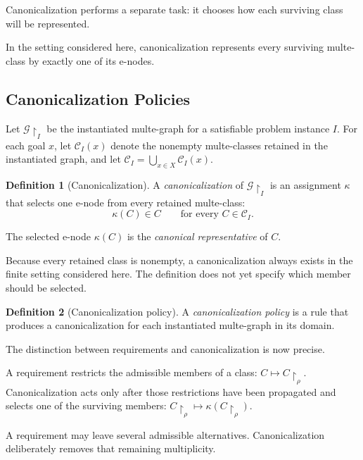 \documentclass[sigconf,nonacm]{acmart}
\theoremstyle{definition}
\newtheorem{definition}{Definition}[section]
\theoremstyle{plain}
\theoremstyle{remark}
\begin{document}
Canonicalization performs a separate task: it chooses how each
surviving class will be represented.

In the setting considered here, canonicalization represents every
surviving multe-class by exactly one of its e-nodes.

\subsection{Canonicalization Policies}
\label{sec:canonicalization-policies}

Let \(\mathcal G\!\restriction_I\)
be the instantiated multe-graph for a satisfiable problem instance
\(I\).  For each goal \(x\), let \(\mathcal C_I(x)\)
denote the nonempty multe-classes retained in the instantiated
graph, and let
\(\mathcal C_I = \bigcup_{x\in X}\mathcal C_I(x)\).

\begin{definition}[Canonicalization]
A \emph{canonicalization} of
\(\mathcal G\!\restriction_I\) is an assignment \(\kappa\)
that selects one e-node from every retained multe-class:
\[
\kappa(C)\in C
\qquad
\text{for every }C\in\mathcal C_I.
\]

The selected e-node \(\kappa(C)\) is the
\emph{canonical representative} of \(C\).
\end{definition}

Because every retained class is nonempty, a canonicalization always
exists in the finite setting considered here.  The definition does not
yet specify which member should be selected.

\begin{definition}[Canonicalization policy]
A \emph{canonicalization policy} is a rule that produces a
canonicalization for each instantiated multe-graph in its domain.
\end{definition}

The distinction between requirements and canonicalization is now
precise.

A requirement restricts the admissible members of a class:
\(C \mapsto C\!\restriction_{\rho}\).
Canonicalization acts only after those restrictions have been
propagated and selects one of the surviving members:
\(C\!\restriction_{\rho} \mapsto
\kappa(C\!\restriction_{\rho})\).

A requirement may leave several admissible alternatives.
Canonicalization deliberately removes that remaining multiplicity.
\end{document}
